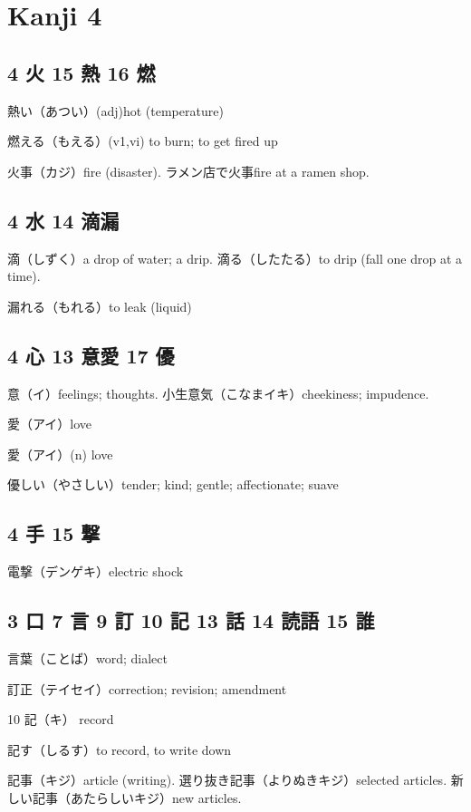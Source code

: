 \chapter{Kanji 4}

\section{4 火 15 熱 16 燃}

熱い（あつい）(adj)hot (temperature)

燃える（もえる）(v1,vi) to burn; to get fired up

火事（カジ）fire (disaster).
ラメン店で火事fire at a ramen shop.

\section{4 水 14 滴漏}

滴（しずく）a drop of water; a drip.
滴る（したたる）to drip (fall one drop at a time).

漏れる（もれる）to leak (liquid)

\section{4 心 13 意愛 17 優}

意（イ）feelings; thoughts.
小生意気（こなまイキ）cheekiness; impudence.

愛（アイ）love

愛（アイ）(n) love

優しい（やさしい）tender; kind; gentle; affectionate; suave

\section{4 手 15 撃}

電撃（デンゲキ）electric shock

\section{3 口 7 言 9 訂 10 記 13 話 14 読語 15 誰}

言葉（ことば）word; dialect

訂正（テイセイ）correction; revision; amendment

10 記（キ） record

記す（しるす）to record, to write down

記事（キジ）article (writing).
選り抜き記事（よりぬきキジ）selected articles.
新しい記事（あたらしいキジ）new articles.

